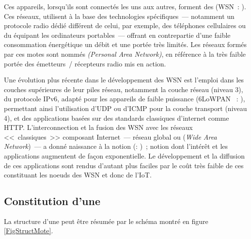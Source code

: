 Ces appareils, lorsqu'ils sont connectés les uns aux autres, forment des
 (WSN~: ).
Ces réseaux, utilisent à la base des technologies spécifiques~--- notamment
un protocole radio dédié différent de celui, par exemple, des
téléphones cellulaires ou du  équipant les ordinateurs
portables~--- offrant en contrepartie d'une faible consommation
énergétique un débit et une portée très limités. Les réseaux formés
par ces motes sont nommés  \emph{(Personal Area Network)},
en référence à la très faible portée des émetteurs~/ récepteurs
radio mis en action.

Une évolution plus récente dans le développement des WSN est l'emploi
dans les couches supérieures de leur piles réseau, notamment la couche
réseau (niveau 3), du protocole IPv6, adapté pour les appareils de faible
puissance (6LoWPAN \cite{6LoWPAN}~: ), permettant ainsi l'utilisation d'UDP ou d'ICMP pour
la couche transport (niveau 4), et des applications basées sur des standards
classiques d'internet comme HTTP. L'interconnection et la fusion des WSN
avec les réseaux <<~classiques~>> composant Internet~--- réseau global
ou  (\emph{Wide Area Network})~--- a donné naissance à la notion
 (: )~;
notion dont l'intérêt et les applications augmentent de façon exponentielle.
Le développement et la diffusion de ces applications sont rendus
d'autant plus faciles par le coût très faible de ces 
constituant les noeuds des WSN et donc de l'IoT.


\subsection{Constitution d'une }
\label{SubsecConstMote}

La structure d'une  peut être résumée par le schéma
montré en figure \vref{FigStructMote}.

